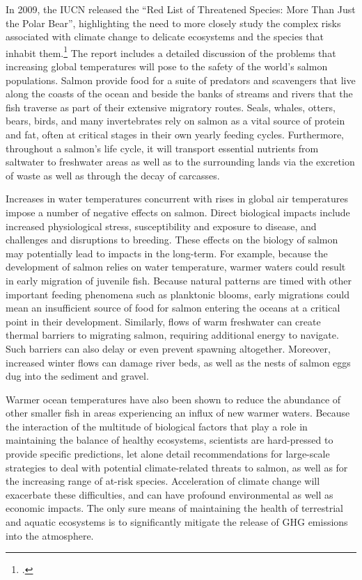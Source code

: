 \documentclass[10pt]{article}
\begin{document}
In 2009, the IUCN released the ``Red List of Threatened Species: More Than Just the Polar Bear'', highlighting the need to more closely study the complex risks associated with climate change to delicate ecosystems and the species that inhabit them.\footcite[][]{IUCNMorePolarBear}
The report includes a detailed discussion of the problems that increasing global temperatures will pose to the safety of the world's salmon populations. 
Salmon provide food for a suite of predators and scavengers that live along the coasts of the ocean and beside the banks of streams and rivers that the fish traverse as part of their extensive migratory routes. 
Seals, whales, otters, bears, birds, and many invertebrates rely on salmon as a vital source of protein and fat, often at critical stages in their own yearly feeding cycles. 
Furthermore, throughout a salmon's life cycle, it will transport essential nutrients from saltwater to freshwater areas as well as to the surrounding lands via the excretion of waste as well as through the decay of carcasses.



Increases in water temperatures concurrent with rises in global air temperatures impose a number of negative effects on salmon. 
Direct biological impacts include increased physiological stress, susceptibility and exposure to disease, and challenges and disruptions to breeding. 
These effects on the biology of salmon may potentially lead to impacts in the long-term. 
For example, because the development of salmon relies on water temperature, warmer waters could result in early migration of juvenile fish. 
Because natural patterns are timed with other important feeding phenomena such as planktonic blooms, early migrations could mean an insufficient source of food for salmon entering the oceans at a critical point in their development. 
Similarly, flows of warm freshwater can create thermal barriers to migrating salmon, requiring additional energy to navigate. 
Such barriers can also delay or even prevent spawning altogether. 
Moreover, increased winter flows can damage river beds, as well as the nests of salmon eggs dug into the sediment and gravel.



Warmer ocean temperatures have also been shown to reduce the abundance of other smaller fish in areas experiencing an influx of new warmer waters. 
Because the interaction of the multitude of biological factors that play a role in maintaining the balance of healthy ecosystems, scientists are hard-pressed to provide specific predictions, let alone detail recommendations for large-scale strategies to deal with potential climate-related threats to salmon, as well as for the increasing range of at-risk species. 
Acceleration of climate change will exacerbate these difficulties, and can have profound environmental as well as economic impacts. 
The only sure means of maintaining the health of terrestrial and aquatic ecosystems is to significantly mitigate the release of GHG emissions into the atmosphere.
\end{document}
